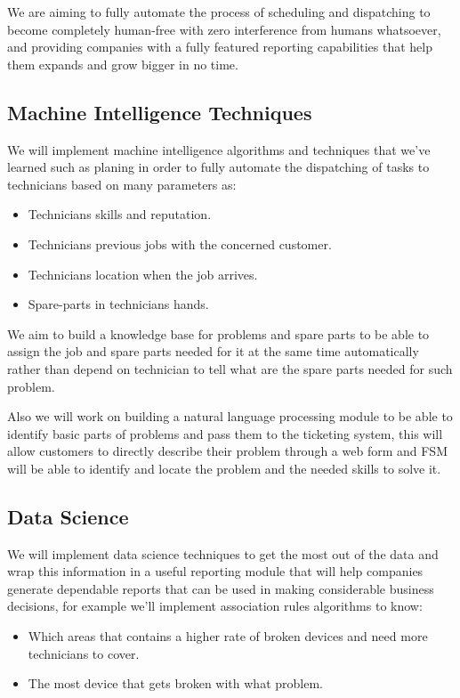 We are aiming to fully automate the process of scheduling and dispatching to become completely human-free with zero interference from humans whatsoever, and providing companies with a fully featured reporting capabilities that help them expands and grow bigger in no time.
	
\subsection{Machine Intelligence Techniques}
	We will implement machine intelligence algorithms and techniques that we've learned such as planing in order to fully automate the dispatching of tasks to technicians based on many parameters as:
	\begin{itemize}
		\item Technicians skills and reputation.
		\item Technicians previous jobs with the concerned customer.
		\item Technicians location when the job arrives.
		\item Spare-parts in technicians hands.
	\end{itemize}
	
	We aim to build a knowledge base for problems and spare parts to be able to assign the job and spare parts needed for it at the same time automatically rather than depend on technician to tell what are the spare parts needed for such problem.
	
	Also we will work on building a natural language processing module to be able to identify basic parts of problems and pass them to the ticketing system, this will allow customers to directly describe their problem through a web form and FSM will be able to identify and locate the problem and the needed skills to solve it.
	
\subsection{Data Science}
	We will implement data science techniques to get the most out of the data and wrap this information in a useful reporting module that will help companies generate dependable reports that can be used in making considerable business decisions, for example we'll implement association rules algorithms to know:
	\begin{itemize}
		\item Which areas that contains a higher rate of broken devices and need more technicians to cover.
		\item The most device that gets broken with what problem.
	\end{itemize}
	  